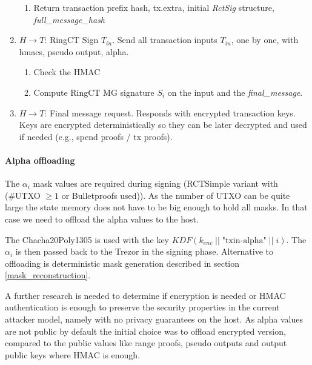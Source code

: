 \documentclass[]{article}
\begin{document}
\begin{enumerate}
\begin{enumerate}
		\item Return transaction prefix hash, tx.extra, initial \emph{RctSig} structure, \emph{full\_message\_hash}
	\end{enumerate} 
	
	\item $H \rightarrow T$: RingCT Sign $T_{in}$. Send all transaction inputs $T_{in}$, one by one, with hmacs, pseudo output, alpha.
	\begin{enumerate}
		\item Check the HMAC
		
		\item Compute RingCT MG signature $S_i$ on the input and the \emph{final\_message}.
		
	\end{enumerate} 

	\item $H \rightarrow T$: Final message request. Responds with encrypted transaction keys. Keys are encrypted deterministically so they can be later decrypted and used if needed (e.g., spend proofs / tx proofs).
	
\end{enumerate}


\paragraph{Alpha offloading}
The $\alpha_i$ mask values are required during signing (RCTSimple variant with (\#UTXO $\ge 1$ or Bulletproofs used)). As the number of UTXO can be quite large the state memory does not have to be big enough to hold all masks. In that case we need to offload the alpha values to the host. 

The Chacha20Poly1305 is used with the key $\textit{KDF}\left(k_{enc} \; || \; \text{"txin-alpha"} \; || \; i\right)$. The $\alpha_i$ is then passed back to the Trezor in the signing phase. Alternative to offloading is deterministic mask generation described in section \ref{mask_reconstruction}.

A further research is needed to determine if encryption is needed or HMAC authentication is enough to preserve the security properties in the current attacker model, namely with no privacy guarantees on the host. As alpha values are not public by default the initial choice was to offload encrypted version, compared to the public values like range proofs, pseudo outputs and output public keys where HMAC is enough.
\end{document}
